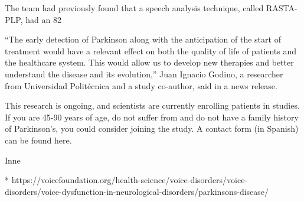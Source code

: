 The team had previously found that a speech analysis technique, called RASTA-PLP, had an 82%

“The early detection of Parkinson along with the anticipation of the start of treatment would have a relevant effect on both the quality of life of patients and the healthcare system. This would allow us to develop new therapies and better understand the disease and its evolution,” Juan Ignacio Godino, a researcher from Universidad Politécnica and a study co-author, said in a news release.

This research is ongoing, and scientists are currently enrolling patients in studies. If you are 45-90 years of age, do not suffer from and do not have a family history of Parkinson’s, you could consider joining the study. A contact form (in Spanish) can be found here.


Inne

* https://voicefoundation.org/health-science/voice-disorders/voice-disorders/voice-dysfunction-in-neurological-disorders/parkinsons-disease/

